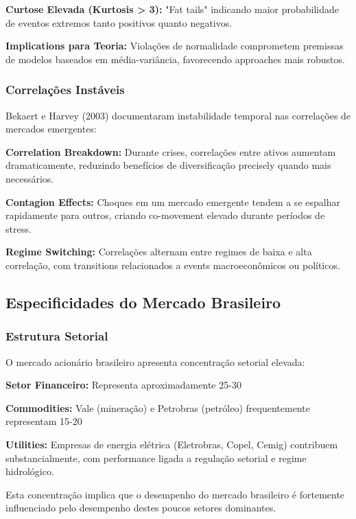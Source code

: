 \textbf{Curtose Elevada (Kurtosis > 3):} "Fat tails" indicando maior probabilidade de eventos extremos tanto positivos quanto negativos.

\textbf{Implications para Teoria:} Violações de normalidade comprometem premissas de modelos baseados em média-variância, favorecendo approaches mais robustos.

\subsubsection{Correlações Instáveis}

Bekaert e Harvey (2003) documentaram instabilidade temporal nas correlações de mercados emergentes:

\textbf{Correlation Breakdown:} Durante crises, correlações entre ativos aumentam dramaticamente, reduzindo benefícios de diversificação precisely quando mais necessários.

\textbf{Contagion Effects:} Choques em um mercado emergente tendem a se espalhar rapidamente para outros, criando co-movement elevado durante períodos de stress.

\textbf{Regime Switching:} Correlações alternam entre regimes de baixa e alta correlação, com transitions relacionados a events macroeconômicos ou políticos.

\subsection{Especificidades do Mercado Brasileiro}

\subsubsection{Estrutura Setorial}

O mercado acionário brasileiro apresenta concentração setorial elevada:

\textbf{Setor Financeiro:} Representa aproximadamente 25-30%

\textbf{Commodities:} Vale (mineração) e Petrobras (petróleo) frequentemente representam 15-20%

\textbf{Utilities:} Empresas de energia elétrica (Eletrobras, Copel, Cemig) contribuem substancialmente, com performance ligada a regulação setorial e regime hidrológico.

Esta concentração implica que o desempenho do mercado brasileiro é fortemente influenciado pelo desempenho destes poucos setores dominantes.

